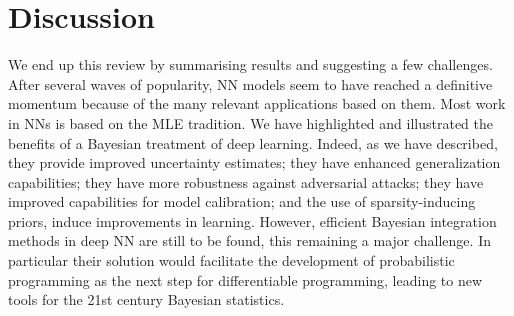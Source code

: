 \section{Discussion}
We end up this review by summarising results and suggesting a few challenges.
After several waves of popularity, NN models seem to 
have reached a definitive momentum because of the many relevant applications
based on them. Most work in NNs is based on the MLE tradition.
We have highlighted and illustrated the benefits of a Bayesian treatment of deep learning. Indeed, as we have described,
they provide improved uncertainty estimates;
they have enhanced generalization capabilities; 
they have more robustness against adversarial attacks;
they have improved capabilities for model calibration;
and the use of sparsity-inducing priors, induce 
improvements in learning. 
However, efficient Bayesian integration methods in 
deep NN are 
still to be found, this remaining a major challenge.
In particular their solution would facilitate the
development of probabilistic programming \cite{gordon2014probabilistic,carpenter2017stan,wood2014new}
as the next step for differentiable programming,
leading to new tools for the 21st century Bayesian 
statistics.